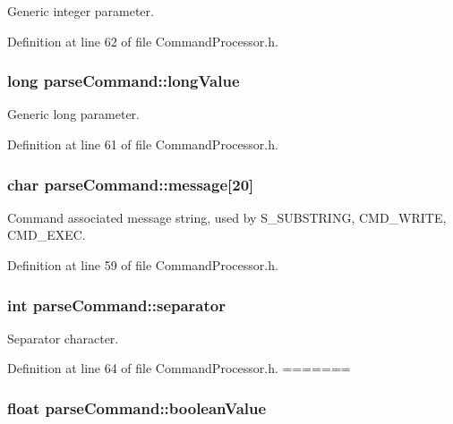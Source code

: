 Generic integer parameter. 



Definition at line 62 of file Command\-Processor.\-h.

\hypertarget{structparse_command_ad062df88615d7d66ded447dd4ff87bad}{
\subsubsection[{long\-Value}]{\setlength{\rightskip}{0pt plus 5cm}long parse\-Command\-::long\-Value}}\label{structparse_command_ad062df88615d7d66ded447dd4ff87bad}


Generic long parameter. 



Definition at line 61 of file Command\-Processor.\-h.

\hypertarget{structparse_command_ab80399acc713a2d31a48dd2db5c7d0a2}{
\subsubsection[{message}]{\setlength{\rightskip}{0pt plus 5cm}char parse\-Command\-::message\mbox{[}20\mbox{]}}}\label{structparse_command_ab80399acc713a2d31a48dd2db5c7d0a2}


Command associated message string, used by S\-\_\-\-S\-U\-B\-S\-T\-R\-I\-N\-G, C\-M\-D\-\_\-\-W\-R\-I\-T\-E, C\-M\-D\-\_\-\-E\-X\-E\-C. 



Definition at line 59 of file Command\-Processor.\-h.

\hypertarget{structparse_command_a5f5c48be92f3aae7c4b1b71ca750298b}{
\subsubsection[{separator}]{\setlength{\rightskip}{0pt plus 5cm}int parse\-Command\-::separator}}\label{structparse_command_a5f5c48be92f3aae7c4b1b71ca750298b}


Separator character. 



Definition at line 64 of file Command\-Processor.\-h.
=======
\hypertarget{structparse_command_aff75594be6413210138456dc4572be52}{
\subsubsection[{boolean\-Value}]{\setlength{\rightskip}{0pt plus 5cm}float parse\-Command\-::boolean\-Value}}\label{structparse_command_aff75594be6413210138456dc4572be52}


